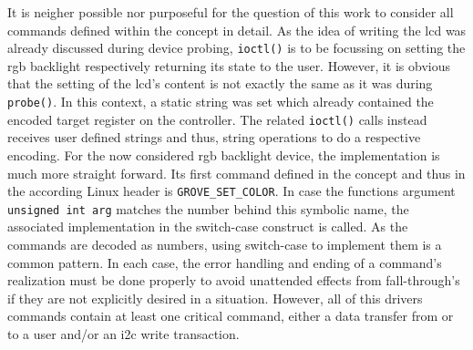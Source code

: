 It is neigher possible nor purposeful for the question of this work to consider all commands defined within the concept in detail.
As the idea of writing the \ac{lcd} was already discussed during device probing, \texttt{ioctl()} is to be focussing on setting the \ac{rgb} backlight respectively returning its state to the user.
However, it is obvious that the setting of the \ac{lcd}'s content is not exactly the same as it was during \texttt{probe()}.
In this context, a static string was set which already contained the encoded target register on the controller.
The related \texttt{ioctl()} calls instead receives user defined strings and thus, string operations to do a respective encoding.
For the now considered \ac{rgb} backlight device, the implementation is much more straight forward.
Its first command defined in the concept and thus in the according Linux header is \texttt{GROVE_SET_COLOR}.
In case the functions argument \texttt{unsigned int arg} matches the number behind this symbolic name, the associated implementation in the switch-case construct is called.
As the commands are decoded as numbers, using switch-case to implement them is a common pattern.
In each case, the error handling and ending of a command's realization must be done properly to avoid unattended effects from fall-through's if they are not explicitly desired in a situation.
However, all of this drivers commands contain at least one critical command, either a data transfer from or to a user and/or an \ac{i2c} write transaction.

